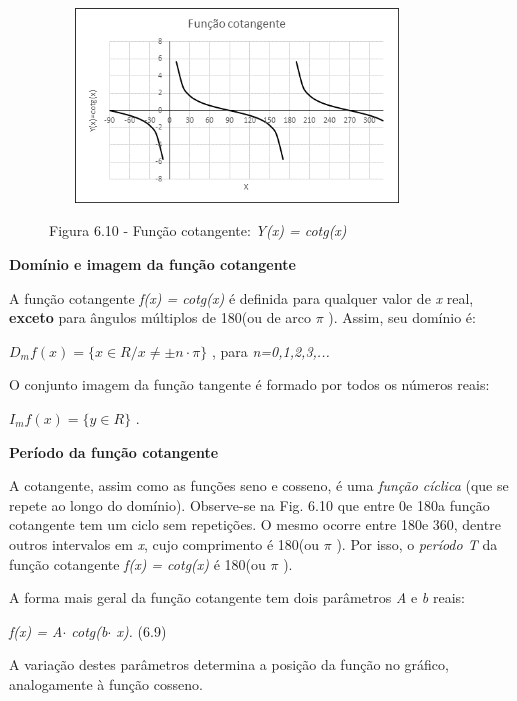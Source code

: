 \begin{figure}[H]
    \begin{Center}
        \includegraphics[width=3.92in,height=2.03in]{capitulos/trigonometria_e_funcoes_trigonometricas/media/image39.png}

        Figura 6.10 - Função cotangente: \textit{Y(x) = cotg(x)}
    \end{Center}
\end{figure}

\textbf{Domínio e imagem da função cotangente}

A função cotangente \textit{f(x) = cotg(x) }é definida para qualquer valor de \textit{x} real, \textbf{exceto} para ângulos múltiplos de 180\degree  (ou de arco \textit{$ \pi $ }). Assim, seu domínio é:

  \( D_{m}f \left( x \right) = \{ x \in  R / x \neq  \pm n  \cdot   \pi  \}  \) , para \textit{n=0,1,2,3,...}

O conjunto imagem da função tangente é formado por todos os números reais:

  \( I_{m}f \left( x \right) = \{ y \in  R \}  \) .

\textbf{Período da função cotangente}

A cotangente, assim como as funções seno e cosseno, é uma \textit{função cíclica} (que se repete ao longo do domínio). Observe-se na Fig. 6.10 que entre 0\degree  e 180\degree a função cotangente tem um ciclo sem repetições. O mesmo ocorre entre 180\degree e 360\degree, dentre outros intervalos em \textit{x}, cujo comprimento é 180\degree (ou  $ \pi $ ). Por isso, o \textit{período T} da função cotangente  \textit{f(x) = cotg(x) } é 180\degree (ou  $ \pi $ ).

A forma mais geral da função cotangente tem dois parâmetros \textit{A }e\textit{ b} reais:

\textit{f(x) = A$ \cdot $ cotg(b$ \cdot $ x).  \tab \tab \tab \tab \tab   }(6.9)

A variação destes parâmetros determina a posição da função no gráfico, analogamente à função cosseno.


